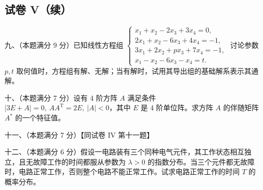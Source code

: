 \documentclass[UTF8,12pt]{ctexart}
\begin{document}
\subsection*{试卷 V（续）}

九、（本题满分 9 分）已知线性方程组 \(\displaystyle \begin{cases}x_1+x_2-2x_3+3x_4=0,\allowbreak \\2x_1+x_2-6x_3+4x_4=-1,\allowbreak \\3x_1+2x_2+px_3+7x_4=-1,\allowbreak \\x_1-x_2-6x_3-x_4=t.\end{cases}\) 讨论参数 \(\displaystyle p,\allowbreak t\) 取何值时，方程组有解、无解；当有解时，试用其导出组的基础解系表示其通解。


十、（本题满分 7 分）设有 4 阶方阵 \(\displaystyle A\) 满足条件 \(\displaystyle |3E+A|=0,\allowbreak \ AA^{\mathrm T}=2E,\allowbreak \ |A|<0\)，其中 \(\displaystyle E\) 是 4 阶单位阵。求方阵 \(\displaystyle A\) 的伴随矩阵 \(\displaystyle A^*\) 的一个特征值。


十一、（本题满分 7 分）【同试卷 IV 第十一题】


十二、（本题满分 6 分）假设一电路装有三个同种电气元件，其工作状态相互独立，且无故障工作的时间都服从参数为 \(\displaystyle \lambda>0\) 的指数分布。当三个元件都无故障时，电路正常工作，否则整个电路不能正常工作。试求电路正常工作的时间 \(\displaystyle T\) 的概率分布。
\end{document}
